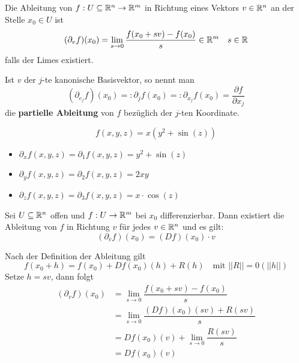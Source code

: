 \documentclass[main.tex]{subfiles}
\begin{document}
\begin{Definition}[Richtungsableitung]
  Die Ableitung von $f: U \subseteq \mathbb{R}^n \to \mathbb{R}^m$ in Richtung eines Vektors $v \in \mathbb{R}^n$ an der Stelle $x_0 \in U$ ist
  $$(\partial_v f) (x_0) = \lim \limits_{s \to 0} \dfrac{f(x_0+sv)-f(x_0)}{s} \in \mathbb{R}^m \quad s \in \mathbb{R}$$
  falls der Limes existiert.

  Ist $v$ der $j$-te kanonische Basisvektor, so nennt man
  $$(\partial_{e_j}f)(x_0) =: \partial_j f(x_0) =: \partial_{x_j}f(x_0) = \dfrac{\partial f}{\partial x_j}$$
  die \textbf{partielle Ableitung} von $f$ bezüglich der $j$-ten Koordinate.
\end{Definition}

\begin{Beispiel}
  $$f(x,y,z) = x(y^2 + \sin(z))$$
  \begin{itemize}
    \item $\partial_x f(x,y,z) = \partial_1 f(x,y,z) = y^2 +\sin(z)$
    \item $\partial_y f(x,y,z) = \partial_2 f(x,y,z) = 2xy$
    \item $\partial_z f(x,y,z) = \partial_3 f(x,y,z) = x \cdot \cos(z)$
  \end{itemize}
\end{Beispiel}

\begin{Theorem}
  Sei $U \subseteq \mathbb{R}^n$ offen und $f : U \to \mathbb{R}^m$ bei $x_0$ differenzierbar. Dann existiert die Ableitung von $f$ in Richtung $v$ für jedes $v \in \mathbb{R}^n$ und es gilt:
  $$(\partial_v f)(x_0) = (Df)(x_0) \cdot v$$
\end{Theorem}

\begin{Beweis}
  Nach der Definition der Ableitung gilt
  $$f(x_0 + h) = f(x_0) + Df(x_0)(h) + R(h) \quad \text{mit } ||R|| = 0(||h||)$$
  Setze $h = sv$, dann folgt
  $$\begin{aligned}
    (\partial_v f)(x_0) & = \lim \limits_{s \to 0} \dfrac{f(x_0 + sv) - f(x_0)}{s} \\
    & = \lim \limits_{s \to 0} \dfrac{(Df)(x_0)(sv) + R(sv)}{s} \\
    & = Df(x_0)(v) + \lim \limits_{s \to 0} \dfrac{R(sv)}{s} \\
    & = Df(x_0)(v)
  \end{aligned}$$
\end{Beweis}
\end{document}
